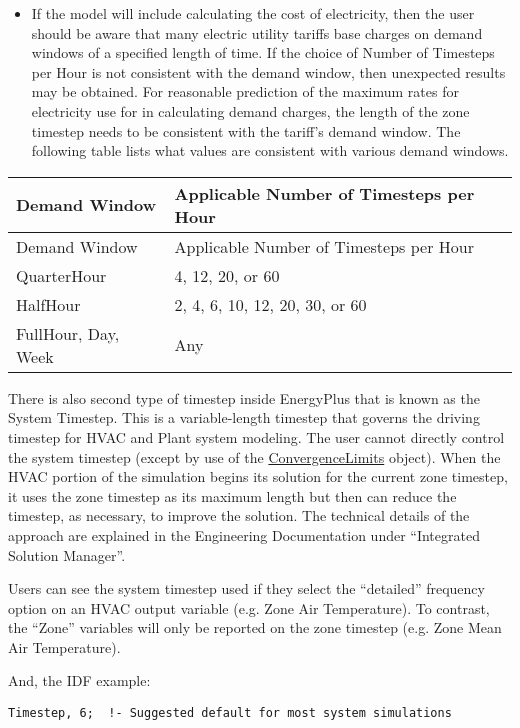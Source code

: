 \begin{itemize}
    \item
    If the model will include calculating the cost of electricity, then the user should be aware that many electric utility tariffs base charges on demand windows of a specified length of time. If the choice of Number of Timesteps per Hour is not consistent with the demand window, then unexpected results may be obtained. For reasonable prediction of the maximum rates for electricity use for in calculating demand charges, the length of the zone timestep needs to be consistent with the tariff's demand window. The following table lists what values are consistent with various demand windows.
\end{itemize}

\begin{longtable}[c]{@{}ll@{}}
    \toprule
    Demand Window & Applicable Number of Timesteps per Hour \tabularnewline
    \midrule
    \endfirsthead

    \toprule
    Demand Window & Applicable Number of Timesteps per Hour \tabularnewline
    \midrule
    \endhead

    QuarterHour & 4, 12, 20, or 60 \tabularnewline
    HalfHour & 2, 4, 6, 10, 12, 20, 30, or 60 \tabularnewline
    FullHour, Day, Week & Any \tabularnewline
    \bottomrule
\end{longtable}

There is also second type of timestep inside EnergyPlus that is known as the System Timestep. This is a variable-length timestep that governs the driving timestep for HVAC and Plant system modeling. The user cannot directly control the system timestep (except by use of the \hyperref[convergencelimits]{ConvergenceLimits} object). When the HVAC portion of the simulation begins its solution for the current zone timestep, it uses the zone timestep as its maximum length but then can reduce the timestep, as necessary, to improve the solution. The technical details of the approach are explained in the Engineering Documentation under ``Integrated Solution Manager''.

Users can see the system timestep used if they select the ``detailed'' frequency option on an HVAC output variable (e.g. Zone Air Temperature). To contrast, the ``Zone'' variables will only be reported on the zone timestep (e.g. Zone Mean Air Temperature).

And, the IDF example:

\begin{lstlisting}
Timestep, 6;  !- Suggested default for most system simulations
\end{lstlisting}

